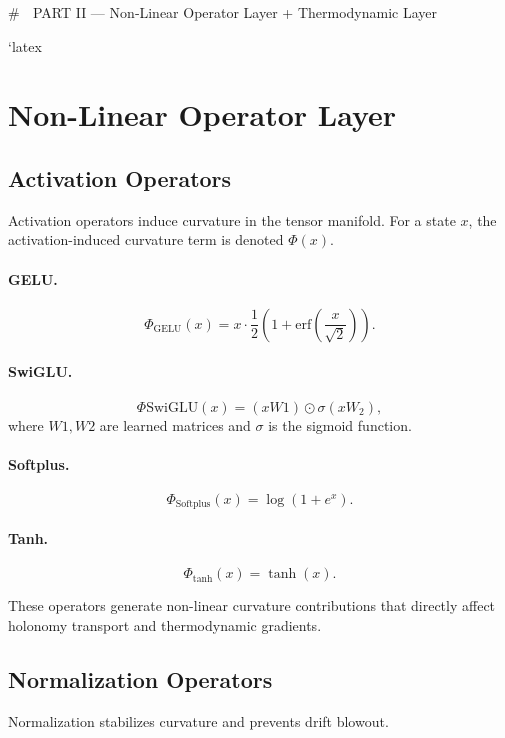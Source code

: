 # 📘 PART II — Non‑Linear Operator Layer + Thermodynamic Layer

`latex
\section{Non-Linear Operator Layer}

\subsection{Activation Operators}

Activation operators induce curvature in the tensor manifold. For a state $x$,
the activation-induced curvature term is denoted $\Phi(x)$.

\paragraph{GELU.}
\[
\Phi_{\text{GELU}}(x) =
x \cdot \frac{1}{2}\left(1 + \mathrm{erf}\left(\frac{x}{\sqrt{2}}\right)\right).
\]

\paragraph{SwiGLU.}
\[
\Phi{\text{SwiGLU}}(x) = (xW1) \odot \sigma(xW_2),
\]
where $W1, W2$ are learned matrices and $\sigma$ is the sigmoid function.

\paragraph{Softplus.}
\[
\Phi_{\text{Softplus}}(x) = \log(1 + e^x).
\]

\paragraph{Tanh.}
\[
\Phi_{\tanh}(x) = \tanh(x).
\]

These operators generate non-linear curvature contributions that directly affect
holonomy transport and thermodynamic gradients.

\subsection{Normalization Operators}

Normalization stabilizes curvature and prevents drift blowout.

